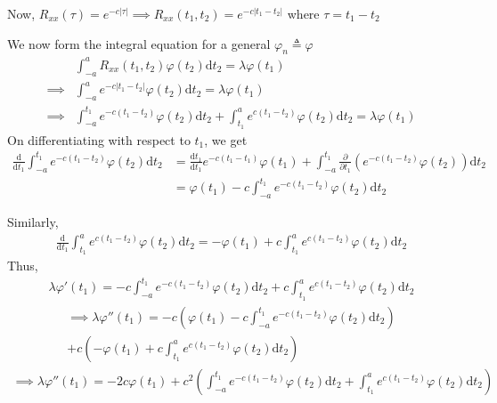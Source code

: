 \documentclass{beamer}
\providecommand{\brak}[1]{\ensuremath{\left(#1\right)}}
\providecommand{\abs}[1]{\left\vert#1\right\vert}
\begin{document}
	\begin{frame}
	Now, $R_{xx}(\tau) = e^{-c\abs{\tau}} \implies R_{xx}(t_1,t_2) = e^{-c\abs{t_1-t_2}}$ where $\tau = t_1-t_2$
	
	We now form the integral equation for a general $\varphi_n \triangleq \varphi$
	\begin{align}
		&\int_{-a}^a R_{xx}(t_1,t_2)\varphi(t_2)\mathrm{d}t_2 = \lambda\varphi(t_1) \\
		\implies &\int_{-a}^a e^{-c\abs{t_1-t_2}}\varphi(t_2)\mathrm{d}t_2 = \lambda\varphi(t_1) \\
		\implies &\int_{-a}^{t_1} e^{-c(t_1-t_2)}\varphi(t_2)\mathrm{d}t_2 + \int_{t_1}^{a} e^{c(t_1-t_2)}\varphi(t_2)\mathrm{d}t_2 = \lambda\varphi(t_1)
	\end{align}
	On differentiating with respect to $t_1$, we get
	\begin{align}
		\frac{\mathrm{d}}{\mathrm{d}t_1} \int_{-a}^{t_1} e^{-c(t_1-t_2)}\varphi(t_2)\mathrm{d}t_2 &= \frac{\mathrm{d}t_1}{\mathrm{d}t_1} e^{-c(t_1-t_1)}\varphi(t_1) + \int_{-a}^{t_1} \frac{\partial}{\partial t_1} \brak{e^{-c(t_1-t_2)}\varphi(t_2)}\mathrm{d}t_2 \\
		&= \varphi(t_1) -c\int_{-a}^{t_1} e^{-c(t_1-t_2)}\varphi(t_2)\mathrm{d}t_2
	\end{align}
	\end{frame}
	
	\begin{frame}
	Similarly, 
	\begin{align}
		\frac{\mathrm{d}}{\mathrm{d}t_1} \int_{t_1}^{a} e^{c(t_1-t_2)}\varphi(t_2)\mathrm{d}t_2 = -\varphi(t_1) + c\int_{t_1}^{a} e^{c(t_1-t_2)}\varphi(t_2)\mathrm{d}t_2
	\end{align}
	Thus,
	\begin{align}
		\lambda\varphi'(t_1) = -c\int_{-a}^{t_1} e^{-c(t_1-t_2)}\varphi(t_2)\mathrm{d}t_2 + c\int_{t_1}^{a} e^{c(t_1-t_2)}\varphi(t_2)\mathrm{d}t_2
	\end{align}
	\begin{multline}
		\implies \lambda\varphi''(t_1) = -c\brak{\varphi(t_1) -c\int_{-a}^{t_1} e^{-c(t_1-t_2)}\varphi(t_2)\mathrm{d}t_2} \\+ c\brak{-\varphi(t_1) + c\int_{t_1}^{a} e^{c(t_1-t_2)}\varphi(t_2)\mathrm{d}t_2}
	\end{multline}
	\begin{align}
		\implies \lambda\varphi''(t_1) = -2c\varphi(t_1) + c^2\brak{\int_{-a}^{t_1} e^{-c(t_1-t_2)}\varphi(t_2)\mathrm{d}t_2 + \int_{t_1}^{a} e^{c(t_1-t_2)}\varphi(t_2)\mathrm{d}t_2}
	\end{align}
	\end{frame}
	
\end{document}
